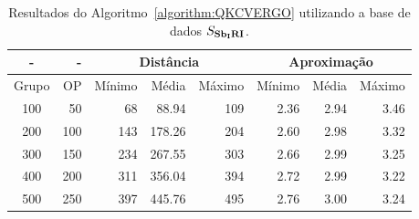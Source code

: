 \begin{table}[!htb]
  \caption{Resultados do Algoritmo~\ref{algorithm:QKCVERGO} utilizando a base de dados $S_{\textbf{Sb\textsubscript{I}RI}}{}$.}
  \label{table:GBAOFAHZ}
  \centering
  \begin{tabular}{|c|r|r|r|r|r|r|r|}
    \hline
      -      &  -   & \multicolumn{3}{c|}{Distância}             & \multicolumn{3}{c|}{Aproximação}           \\ \hline
    Grupo    & OP   & Mínimo       & Média        & Máximo       & Mínimo       & Média        & Máximo       \\ \hline  
    100      & 50   & 68           & 88.94        & 109          & 2.36         & 2.94         & 3.46         \\ \hline
    200      & 100  & 143          & 178.26       & 204          & 2.60         & 2.98         & 3.32         \\ \hline
    300      & 150  & 234          & 267.55       & 303          & 2.66         & 2.99         & 3.25         \\ \hline
    400      & 200  & 311          & 356.04       & 394          & 2.72         & 2.99         & 3.22         \\ \hline
    500      & 250  & 397          & 445.76       & 495          & 2.76         & 3.00         & 3.24         \\ \hline    
  \end{tabular}
\end{table}
